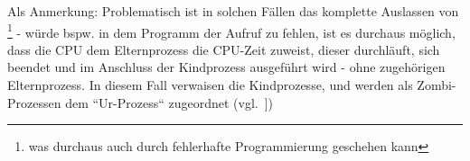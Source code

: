 \begin{itemize}
    Als Anmerkung: Problematisch ist in solchen Fällen das komplette Auslassen von \footnote{was durchaus auch durch fehlerhafte Programmierung geschehen kann} - würde bspw. in dem Programm der Aufruf zu  fehlen, ist es durchaus möglich, dass die CPU dem Elternprozess die CPU-Zeit zuweist, dieser durchläuft, sich beendet und im Anschluss der Kindprozess ausgeführt wird - ohne zugehörigen Elternprozess. In diesem Fall verwaisen die Kindprozesse, und werden als Zombi-Prozessen dem ``Ur-Prozess`` zugeordnet (vgl.~\cite[94 f.]{Man20e}])
\end{itemize}